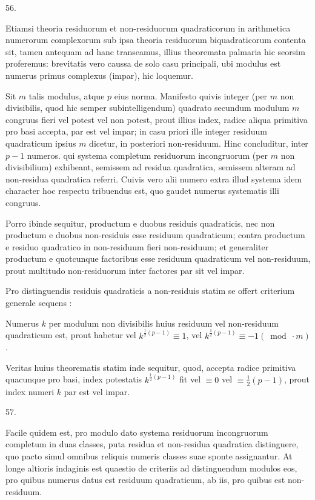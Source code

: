 \documentclass[10pt]{article}
\begin{document}
56.

Etiamsi theoria residuorum et non-residuorum quadraticorum in arithmetica numerorum complexorum sub ipsa theoria residuorum biquadraticorum contenta sit, tamen antequam ad hanc transeamus, illius theoremata palmaria hic seorsim proferemus: brevitatis vero caussa de solo casu principali, ubi modulus est numerus primus complexus (impar), hic loquemur.

Sit \(m\) talis modulus, atque \(p\) eius norma. Manifesto quivis integer (per \(m\) non divisibilis, quod hic semper subintelligendum) quadrato secundum modulum \(m\) congruus fieri vel potest vel non potest, prout illius index, radice aliqua primitiva pro basi accepta, par est vel impar; in casu priori ille integer residuum quadraticum ipsius \(m\) dicetur, in posteriori non-residuum. Hinc concluditur, inter \(p-1\) numeros. qui systema completum residuorum incongruorum (per \(m\) non divisibilium) exhibeant, semissem ad residua quadratica, semissem alteram ad non-residua quadratica referri. Cuivis vero alii numero extra illud systema idem
character hoc respectu tribuendus est, quo gaudet numerus systematis illi congruus.

Porro ibinde sequitur, productum e duobus residuis quadraticis, nec non productum e duobus non-residuis esse residuum quadraticum; contra productum e residuo quadratico in non-residuum fieri non-residuum; et generaliter productum e quotcunque factoribus esse residuum quadraticum vel non-residuum, prout multitudo non-residuorum inter factores par sit vel impar.

Pro distinguendis residuis quadraticis a non-residuis statim se offert criterium generale sequens :

Numerus \(k\) per modulum non divisibilis huius residuum vel non-residuum quadraticum est, prout habetur vel \(k^{\frac{1}{2}(p-1)} \equiv 1\), vel \(k^{\frac{1}{2}(p-1)} \equiv-1(\bmod \cdot m)\).

Veritas huius theorematis statim inde sequitur, quod, accepta radice primitiva quacunque pro basi, index potestatis \(k^{\frac{1}{2}(p-1)}\) fit vel \(\equiv 0\) vel \(\equiv \frac{1}{2}(p-1)\), prout index numeri \(k\) par est vel impar.

57.

Facile quidem est, pro modulo dato systema residuorum incongruorum completum in duas classes, puta residua et non-residua quadratica distinguere, quo pacto simul omnibus reliquis numeris classes suae sponte assignantur. At longe altioris indaginis est quaestio de criteriis ad distinguendum modulos eos, pro quibus numerus datus est residuum quadraticum, ab iis, pro quibus est non-residuum.
\end{document}
